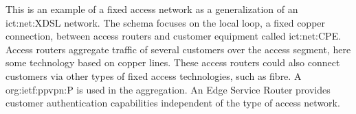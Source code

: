 This is an example of a fixed access network as a generalization of an \acs{ict:net:XDSL} network.
The schema focuses on the local loop, a fixed copper connection, between access routers and customer equipment called \acs{ict:net:CPE}.
Access routers aggregate traffic of several customers over the access segment, here some technology based on copper lines.
These access routers could also connect customers via other types of fixed access technologies, such as fibre.
A \ac{org:ietf:ppvpn:P} is used in the aggregation.
An Edge Service Router provides customer authentication capabilities independent of the type of access network.

